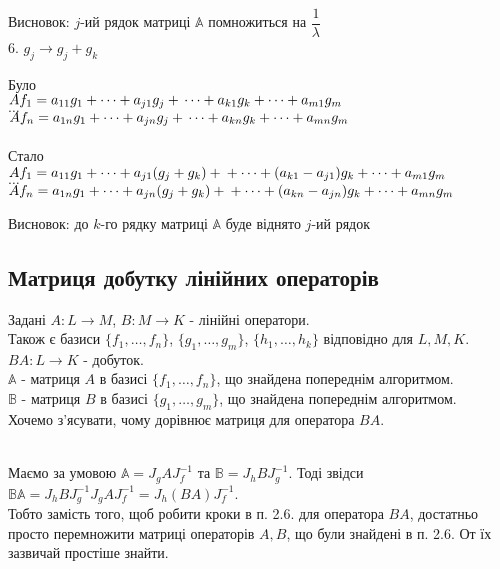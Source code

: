 \documentclass[a4paper, 10pt]{article}
\theoremstyle{theoremdd}
\begin{document}
	Висновок: $j$-ий рядок матриці $\mathbb{A}$ помножиться на $\dfrac{1}{\lambda}$
	\bigskip \\
	6. $g_j \rightarrow g_j + g_k$
	\multicolsep=0pt
	\begin{multicols}{2}
	Було \\
	$Af_1 = a_{11}g_1 + \dots + a_{j1}g_j + \\ \dots + a_{k1}g_k + \dots + a_{m1}g_m$\\
	$\dots$\\
	$Af_n = a_{1n}g_1 + \dots + a_{jn}g_j + \\ \dots + a_{kn}g_k + \dots + a_{mn}g_m$\\
	\columnbreak
	\\
	Стало \\
	$Af_1 = a_{11}g_1 + \dots + a_{j1}(g_j+g_k) + \\ + \dots + (a_{k1}-a_{j1})g_k + \dots + a_{m1}g_m$\\
	$\dots$\\
	$Af_n = a_{1n}g_1 + \dots + a_{jn}(g_j+g_k) + \\ + \dots + (a_{kn}-a_{jn})g_k + \dots + a_{mn}g_m$
	\end{multicols}
	Висновок: до $k$-го рядку матриці $\mathbb{A}$ буде віднято $j$-ий рядок
	\fi
	
	\subsection{Матриця добутку лінійних операторів}
	Задані $A \colon L \to M$, $B \colon M \to K$ - лінійні оператори.\\
	Також є базиси $\{f_1,\dots, f_n\}$, $\{g_1,\dots, g_m\}$, $\{h_1,\dots, h_k\}$ відповідно для $L,M,K$.\\
	$BA \colon L \to K$ - добуток.\\
	$\mathbb{A}$ - матриця $A$ в базисі $\{f_1,\dots,f_n\}$, що знайдена попереднім алгоритмом.\\
	$\mathbb{B}$ - матриця $B$ в базисі $\{g_1,\dots,g_m\}$, що знайдена попереднім алгоритмом.\\
	Хочемо з'ясувати, чому дорівнює матриця для оператора $BA$.\\
	\\
Маємо за умовою $\mathbb{A} = J_g A J_f^{-1}$ та $\mathbb{B} = J_h B J_g^{-1}$. Тоді звідси\\
$\mathbb{B} \mathbb{A} = J_h B J_g^{-1} J_g A J_f^{-1} = J_h (BA) J_f^{-1}$.\\
Тобто замість того, щоб робити кроки в п. 2.6. для оператора $BA$, достатньо просто перемножити матриці операторів $A,B$, що були знайдені в п. 2.6. От їх зазвичай простіше знайти.
\end{document}
